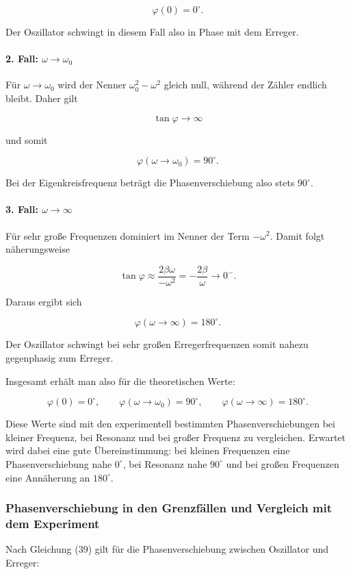 \documentclass{report}
\begin{document}
\[
\boxed{\varphi(0)=0^\circ.}
\]

Der Oszillator schwingt in diesem Fall also in Phase mit dem Erreger.

\paragraph{2. Fall: $\omega \to \omega_0$}
Für $\omega \to \omega_0$ wird der Nenner $\omega_0^2-\omega^2$ gleich null, während der Zähler endlich bleibt. Daher gilt

\[
\tan\varphi \to \infty
\]

und somit

\[
\boxed{\varphi(\omega\to\omega_0)=90^\circ.}
\]

Bei der Eigenkreisfrequenz beträgt die Phasenverschiebung also stets $90^\circ$.

\paragraph{3. Fall: $\omega \to \infty$}
Für sehr große Frequenzen dominiert im Nenner der Term $-\omega^2$. Damit folgt näherungsweise

\[
\tan\varphi \approx \frac{2\beta\omega}{-\omega^2}
= -\frac{2\beta}{\omega}\to 0^-.
\]

Daraus ergibt sich

\[
\boxed{\varphi(\omega\to\infty)=180^\circ.}
\]

Der Oszillator schwingt bei sehr großen Erregerfrequenzen somit nahezu gegenphasig zum Erreger.

Insgesamt erhält man also für die theoretischen Werte:

\[
\boxed{\varphi(0)=0^\circ,\qquad \varphi(\omega\to\omega_0)=90^\circ,\qquad \varphi(\omega\to\infty)=180^\circ.}
\]

Diese Werte sind mit den experimentell bestimmten Phasenverschiebungen 
bei kleiner Frequenz, bei Resonanz und bei großer Frequenz zu vergleichen. 
Erwartet wird dabei eine gute Übereinstimmung:
 bei kleinen Frequenzen eine Phasenverschiebung nahe $0^\circ$, 
bei Resonanz nahe $90^\circ$ und bei großen Frequenzen eine Annäherung an $180^\circ$.

\subsubsection*{Phasenverschiebung in den Grenzfällen und Vergleich mit dem Experiment}

Nach Gleichung (39) gilt für die Phasenverschiebung zwischen Oszillator und Erreger:
\end{document}
